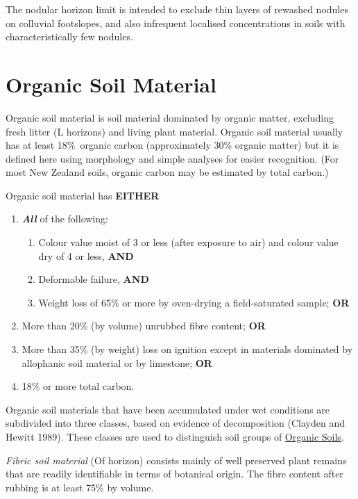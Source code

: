 \documentclass[
  letterpaper,
  DIV=11,
  numbers=noendperiod]{scrreprt}
\providecommand{\tightlist}{%
  \setlength{\itemsep}{0pt}\setlength{\parskip}{0pt}}\usepackage{longtable,booktabs,array}
\begin{document}
The nodular horizon limit is intended to exclude thin layers of rewashed
nodules on colluvial footslopes, and also infrequent localised
concentrations in soils with characteristically few nodules.

\hypertarget{sec-diag-org}{%
\section{Organic Soil Material}\label{sec-diag-org}}

Organic soil material is soil material dominated by organic matter,
excluding fresh litter (L horizons) and living plant material. Organic
soil material usually has at least 18\%~organic carbon (approximately
30\% organic matter) but it is defined here using morphology and simple
analyses for easier recognition. (For most New Zealand soils, organic
carbon may be estimated by total carbon.)

Organic soil material has \textbf{EITHER}

\begin{enumerate}
\def\labelenumi{\arabic{enumi}.}
\tightlist
\item
  \textbf{\emph{All}} of the following:

  \begin{enumerate}
  \def\labelenumii{(\alph{enumii})}
  \tightlist
  \item
    Colour value moist of 3 or less (after exposure to air) and colour
    value dry of 4 or less, \textbf{AND}
  \item
    Deformable failure, \textbf{AND}
  \item
    Weight loss of 65\% or more by oven-drying a field-saturated sample;
    \textbf{OR}
  \end{enumerate}
\item
  More than 20\% (by volume) unrubbed fibre content; \textbf{OR}
\item
  More than 35\% (by weight) loss on ignition except in materials
  dominated by allophanic soil material or by limestone; \textbf{OR}
\item
  18\% or more total carbon.
\end{enumerate}

Organic soil materials that have been accumulated under wet conditions
are subdivided into three classes, based on evidence of decomposition
(Clayden and Hewitt 1989). These classes are used to distinguish soil
groups of \protect\hyperlink{sec-ord-O}{Organic Soils}.

\emph{Fibric soil material} (Of horizon) consists mainly of well
preserved plant remains that are readily identifiable in terms of
botanical origin. The fibre content after rubbing is at least 75\% by
volume.
\end{document}
